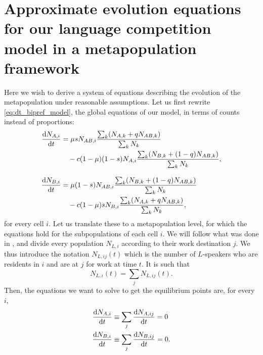\documentclass[../thesis.tex]{subfiles}
\begin{document}
\chapter[Approximate equations in a metapopulation]{Approximate evolution equations for our language competition model in a metapopulation framework}
\label{ch:appendix_metapop_equations}

Here we wish to derive a system of equations describing the evolution of the
metapopulation under reasonable assumptions. Let us first rewrite
\cref{eq:dt_bipref_model}, the global equations of our model, in terms of counts instead
of proportions:
\begin{equation}
\label{eq:bipref_cell_eq}
  \begin{aligned} 
    \dv{N_{A, i}}{t} &= \mu s N_{AB, i}
      \frac{
          \sum_{k}  (N_{A, k} + q N_{AB,k})
      }{
          \sum_{k} N_{k}
      }
    \\
    & \quad - c (1-\mu) (1-s) N_{A, i}
      \frac{
          \sum_{k} (N_{B,k} + (1-q) N_{AB, k})
      }{
          \sum_{k} N_{k}
      },
    \\[2ex]
    \dv{N_{B, i}}{t} &= \mu (1-s) N_{AB, i}
      \frac{
          \sum_{k} (N_{B, k} + (1-q) N_{AB,k})
      }{
          \sum_{k} N_{k}
      }
    \\
    & \quad - c (1-\mu) s N_{B, i}
      \frac{
          \sum_{k} (N_{A,k} + q N_{AB, k})
      }{
          \sum_{k} N_{k}
      },
  \end{aligned}
\end{equation}
for every cell $i$. Let us translate these to a metapopulation level, for which the
equations hold for the subpopulations of each cell $i$. We will follow what was done in
\cite{SattenspielStructuredEpidemic1995}, and divide every population $N_{L,i}$
according to their work destination $j$. We thus introduce the notation $N_{L,ij} (t)$
which is the number of $L$-speakers who are residents in $i$ and are at $j$ for work at
time $t$. It is such that
\begin{equation}
  N_{L,i} (t) = \sum_j N_{L, ij} (t).
\end{equation}
Then, the equations we want to solve to get the equilibrium points are, for every $i$,
\begin{equation}
\label{eq:fixed_points_eq}
  \begin{aligned} 
    \dv{N_{A, i}}{t} &\equiv \sum_j \dv{N_{A, ij}}{t} = 0 \\
    \dv{N_{B, i}}{t} &\equiv \sum_j \dv{N_{B, ij}}{t} = 0.
  \end{aligned}
\end{equation}
\end{document}

